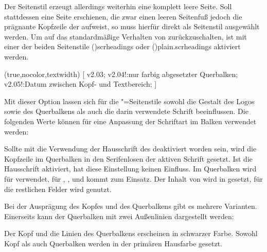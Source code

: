 \begin{DeclareEntity*}{}
\begin{DeclareEntity*}{}
\begin{DeclareEntity*}{}
\begin{Declaration}
\begin{Declaration}
\begin{Declaration}
Der Seitenstil  erzeugt allerdings weiterhin eine komplett 
leere Seite. Soll stattdessen eine Seite erschienen, die zwar einen leeren 
Seitenfuß jedoch die prägnante Kopfzeile der \TnUD aufweist, so muss hierfür 
direkt  als Seitenstil ausgewählt werden. Um auf 
das standardmäßige Verhalten von \KOMAScript zurückzuschalten, ist mit 
 einer der beiden Seitenstile
\PageStyle(){scrheadings} oder 
\PageStyle(){plain.scrheadings}
aktiviert werden.
\end{Declaration}
\end{Declaration}
\end{Declaration}
%

\begin{Declaration}
  {}
  (true,nocolor,textwidth)
[%
  v2.03;%
  v2.04!:nur farbig abgesetzter Querbalken;%
  v2.05!:Datum zwischen Kopf- und Textbereich;%
]

Mit dieser Option lassen sich für die "=Seitenstile 
sowohl die Gestalt des Logos sowie des Querbalkens als auch die darin 
verwendete Schrift beeinflussen. Die folgenden Werte können für eine Anpassung 
der Schriftart im Balken verwendet werden:
%
\begin{DeclareValues}{}
  Sollte mit  die Verwendung der Hausschrift des \TUDCDs 
  deaktiviert worden sein, wird die Kopfzeile im Querbalken in den Serifenlosen 
  der aktiven Schrift gesetzt. Ist die Hausschrift aktiviert, hat diese 
  Einstellung keinen Einfluss.
  Im Querbalken wird für   
  verwendet, für , , 
   und  kommt  zum 
  Einsatz.
  Der Inhalt von  wird in  gesetzt, für 
  die restlichen Felder wird  genutzt.
\end{DeclareValues}

Bei der Ausprägung des Kopfes und des Querbalkens gibt es mehrere Varianten. 
Einerseits kann der Querbalken mit zwei Außenlinien dargestellt werden:
%
\begin{DeclareValues}{}
  Der Kopf und die Linien des Querbalkens erscheinen in schwarzer Farbe.
  Sowohl Kopf als auch Querbalken werden in der primären Hausfarbe gesetzt.
\end{DeclareValues}


\end{Declaration}
\end{DeclareEntity*}
\end{DeclareEntity*}
\end{DeclareEntity*}
